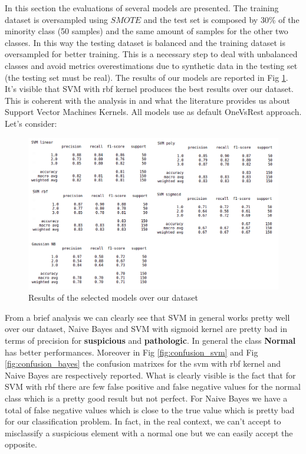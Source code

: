 \documentclass[a4paper,12pt]{article}
\begin{document}
In this section the evaluations of several models are presented. The training dataset is oversampled using $SMOTE$ and the test set is composed by 30\% of the minority class (50 samples) and the same amount of samples for the other two classes. In this way the testing dataset is balanced and the training dataset is oversampled for better training. This is a necessary step to deal with unbalanced classes and avoid metrics overestimations due to synthetic data in the testing set (the testing set must be real). 
The results of our models are reported in Fig \ref{fig:fulldataset}. It's visible that SVM with rbf kernel produces the best results over our dataset. This is coherent with the analysis in \cite{ml} and what the literature provides us about Support Vector Machines Kernels. All models use as default OneVsRest approach. Let's consider:
\bigbreak
\begin{figure}[H]
  \begin{center}
  \includegraphics[width=1.0\textwidth]{images/fulldataset.png}
  \end{center}
  \caption{Results of the selected models over our dataset}
  \label{fig:fulldataset}
\end{figure}

\noindent From a brief analysis we can clearly see that SVM in general works pretty well over our dataset, Naive Bayes and SVM with sigmoid kernel are pretty bad in terms of precision for \textbf{suspicious} and \textbf{pathologic}. In general the class \textbf{Normal} has better performances. Moreover in Fig \ref{fig:confusion_svm} and Fig \ref{fig:confusion_bayes} the confusion matrixes for the svm with rbf kernel and Naive Bayes are respectively reported. What is clearly visible is the fact that for SVM with rbf there are few false positive and false negative values for the normal class which is a pretty good result but not perfect. For Naive Bayes we have a total of false negative values which is close to the true value which is pretty bad for our classification problem. In fact, in the real context, we can't accept to misclassify a suspicious element with a normal one but we can easily accept the opposite.
\end{document}
